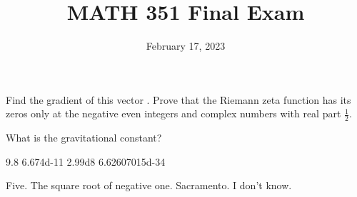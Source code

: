 \documentclass[11pt]{exam}
\title{MATH 351 Final Exam}
\date{February 17, 2023}
\begin{document}
\maketitle

\vspace{0.1in}
\begin{center}
\end{center}
\begin{questions}
\question[1]
Find the gradient of this vector .
\vspace{5.8in}
\question[1]
Prove that the Riemann zeta function has its zeros only at the negative even integers and complex numbers with real part $\frac{1}{2}$.
\vspace{0.3in}

\question[1] What is the gravitational constant? \normalfont
\begin{choices}
\choice \num{9.8}
\choice \num{6.674d-11}
\choice \num{2.99d8}
\choice \num{6.62607015d-34}
\end{choices}

\question[97]  \normalfont
\begin{choices}
\choice Five.
\choice The square root of negative one.
\choice Sacramento.
\choice I don't know.
\end{choices}
\end{questions}
\end{document}
